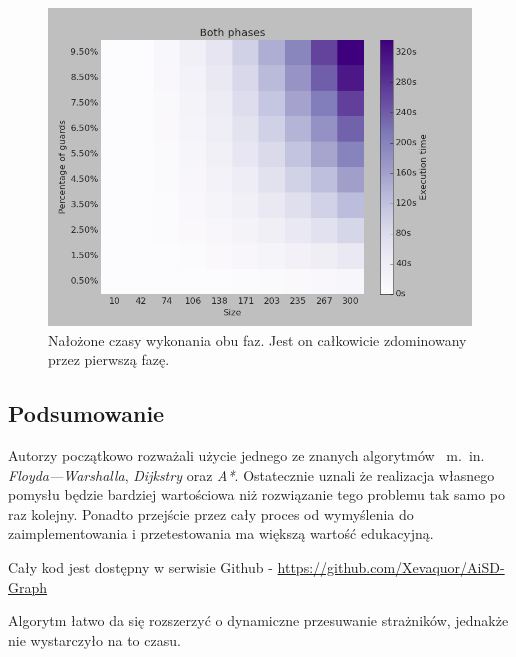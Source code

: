 \documentclass[12pt]{article}
\begin{document}
\begin{figure}[H]
\includegraphics[width=\textwidth,keepaspectratio=true]{Thief/combined.png}
\caption{
Nałożone czasy wykonania obu faz. Jest on całkowicie zdominowany przez pierwszą fazę.
}
\end{figure}	

\subsection{Podsumowanie}
Autorzy początkowo rozważali użycie jednego ze znanych algorytmów ~m.~in. \emph{Floyda---Warshalla}, \emph{Dijkstry} oraz \emph{A*}. Ostatecznie uznali że realizacja własnego pomysłu będzie bardziej wartościowa niż rozwiązanie tego problemu tak samo po raz kolejny. Ponadto przejście przez cały proces od wymyślenia do zaimplementowania i przetestowania ma większą wartość edukacyjną.

Cały kod jest dostępny w serwisie Github - \url{https://github.com/Xevaquor/AiSD-Graph}

Algorytm łatwo da się rozszerzyć o dynamiczne przesuwanie strażników, jednakże nie wystarczyło na to czasu.
\end{document}
